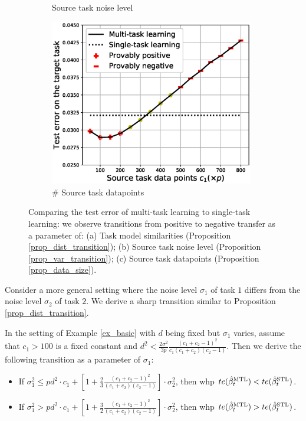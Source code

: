 \begin{figure}
\begin{subfigure}[b]{0.31\textwidth}
		\caption{Source task noise level}
	\end{subfigure}\hfill
	\begin{subfigure}[b]{0.31\textwidth}
		\centering
		\includegraphics[width=0.98\textwidth]{figures/datapoints_phase_transition.eps}
		\caption{\# Source task datapoints}
	\end{subfigure}
	\caption{Comparing the test error of multi-task learning to single-task learning: we observe transitions from positive to negative transfer as a parameter of: (a) Task model similarities (Proposition \ref{prop_dist_transition}); (b) Source task noise level (Proposition \ref{prop_var_transition}); (c) Source task datapoints (Proposition \ref{prop_data_size}).}
	\label{fig_model_shift_phasetrans}
\end{figure}


Consider a more general setting where the noise level $\sigma_1$ of task $1$ differs from the noise level $\sigma_2$ of task $2$.
We derive a sharp transition similar to Proposition \ref{prop_dist_transition}.

\begin{proposition}\label{prop_var_transition}
	In the setting of Example \ref{ex_basic} with $d$ being fixed but $\sigma_1$ varies, assume that $c_1 > 100$ is a fixed constant and $d^2 < \frac {2\sigma^2} {3p} \frac{(c_1 + c_2 -1)^2}{c_1 (c_1 + c_2)(c_2 - 1)}$. Then we derive the following transition as a parameter of $\sigma_1$:
	\begin{itemize}
		\item If $\sigma_1^2 \le p d^2 \cdot c_1 +\left[1+ \frac23\frac{(c_1 + c_2 - 1)^2}{(c_1 + c_2) (c_2 - 1)}\right]\cdot\sigma_2^2$, then whp $te(\hat{\beta}_t^{\text{MTL}}) < te(\hat{\beta}_t^{\text{STL}})$.
		\item If $\sigma_1^2 > p d^2 \cdot c_1 +\left[1+ \frac32\frac{(c_1 + c_2 - 1)^2}{(c_1 + c_2) (c_2 - 1)}\right] \cdot \sigma_2^2$, then whp $te(\hat{\beta}_t^{\text{MTL}}) > te(\hat{\beta}_t^{\text{STL}})$.
	\end{itemize}
\end{proposition}

